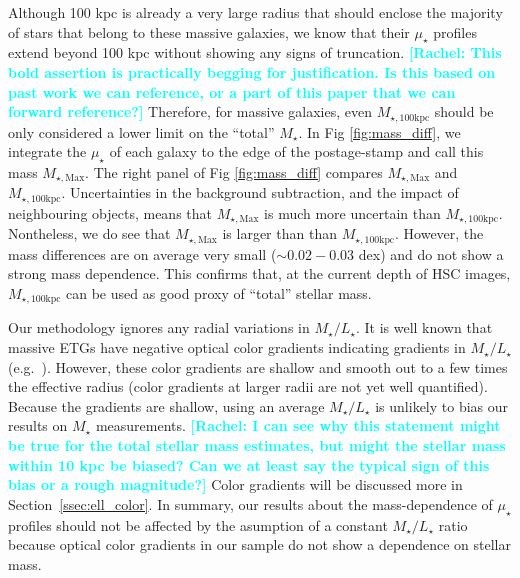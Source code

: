 \documentclass[a4paper,fleqn,usenatbib]{mnras}
\def\mstar{{$M_{\star}$}}
\def\mtot{{$M_{\star,100\mathrm{kpc}}$}}
\def\mmax{{$M_{\star,\mathrm{Max}}$}}
\def\m2l{{$M_{\star}/L_{\star}$}}
\def\mden{{$\mu_{\star}$}}
\newcommand{\rachel}[1]{\textcolor{cyan}{\textbf{[Rachel: #1]}}}
\begin{document}
    Although 100 kpc is already a very large radius that should enclose the majority 
    of stars that belong to these massive galaxies, we know that their \mden{} 
    profiles extend beyond 100 kpc without showing any signs of truncation. 
\rachel{This bold assertion is practically begging for justification.  Is this based on past work we can reference, or a part of this paper that we can forward reference?}
Therefore, for massive galaxies, even \mtot{} should be only considered a lower
    limit on the ``total'' \mstar{}. 
    In Fig \ref{fig:mass_diff}, we integrate the \mden{} of each galaxy to the  edge of the postage-stamp and call this mass \mmax{}. The right panel of Fig \ref{fig:mass_diff} compares \mmax{} and \mtot{}.  Uncertainties in the background subtraction, and the impact of neighbouring objects, means that \mmax{} is much more uncertain than \mtot{}. Nontheless, we do see that \mmax{} is larger than than \mtot{}. However, the mass differences are on average very small ($\sim0.02-0.03$ dex) and 
    do not show a strong mass dependence.  
    This confirms that, at the current depth of HSC images, \mtot{} can be used as 
    good proxy of ``total'' stellar mass.   
    
    Our methodology ignores any radial variations in \m2l{}. 
    It is well known that massive ETGs have negative optical color gradients 
    indicating gradients in \m2l{} (e.g.\ \citealt{Carollo1993, Davies1993, 
    LaBarbera2012, DSouza2015}). However, these color gradients are shallow and smooth out to a few times the effective 
    radius (color gradients at larger radii are not yet well quantified). Because the gradients are shallow, using an average \m2l{} is unlikely to bias our results on \mstar{}
    measurements. \rachel{I can see why this statement might be true for the total stellar mass estimates, but might the stellar mass within 10 kpc be biased?  Can we at least say the typical sign of this bias or a rough magnitude?} Color gradients will be discussed more in Section~\ref{ssec:ell_color}. 
    In summary, our results about the mass-dependence of \mden{} profiles should not be affected by the asumption of a constant  \m2l{} ratio because optical color gradients in our sample do not show a dependence on  stellar mass.
    

    
    
\end{document}
